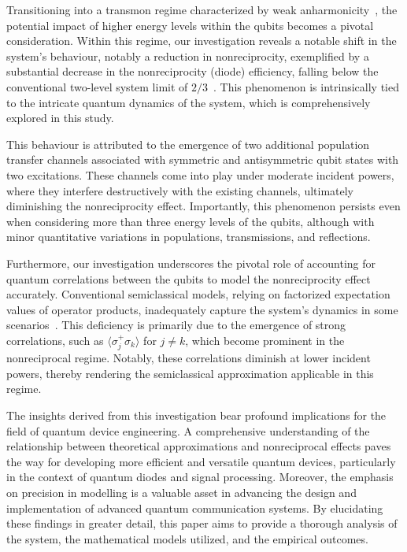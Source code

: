 \documentclass[lettersize,journal]{IEEEtran}
\begin{document}
Transitioning into a transmon regime characterized by weak anharmonicity~\cite{krantz_quantum_2019}, the potential impact of higher energy levels within the qubits becomes a pivotal consideration. Within this regime, our investigation reveals a notable shift in the system's behaviour, notably a reduction in nonreciprocity, exemplified by a substantial decrease in the nonreciprocity (diode) efficiency, falling below the conventional two-level system limit of $2/3$~\cite{muller_nonreciprocal_2017}. This phenomenon is intrinsically tied to the intricate quantum dynamics of the system, which is comprehensively explored in this study.

This behaviour is attributed to the emergence of two additional population transfer channels associated with symmetric and antisymmetric qubit states with two excitations. These channels come into play under moderate incident powers, where they interfere destructively with the existing channels, ultimately diminishing the nonreciprocity effect. Importantly, this phenomenon persists even when considering more than three energy levels of the qubits, although with minor quantitative variations in populations, transmissions, and reflections.

Furthermore, our investigation underscores the pivotal role of accounting for quantum correlations between the qubits to model the nonreciprocity effect accurately. Conventional semiclassical models, relying on factorized expectation values of operator products, inadequately capture the system's dynamics in some scenarios~\cite{carmichael1999statistical}. This deficiency is primarily due to the emergence of strong correlations, such as $\langle \sigma_j^+ \sigma_k \rangle$ for $j\neq k$, which become prominent in the nonreciprocal regime. Notably, these correlations diminish at lower incident powers, thereby rendering the semiclassical approximation applicable in this regime.

The insights derived from this investigation bear profound implications for the field of quantum device engineering. A comprehensive understanding of the relationship between theoretical approximations and nonreciprocal effects paves the way for developing more efficient and versatile quantum devices, particularly in the context of quantum diodes and signal processing. Moreover, the emphasis on precision in modelling is a valuable asset in advancing the design and implementation of advanced quantum communication systems. By elucidating these findings in greater detail, this paper aims to provide a thorough analysis of the system, the mathematical models utilized, and the empirical outcomes.
\end{document}
